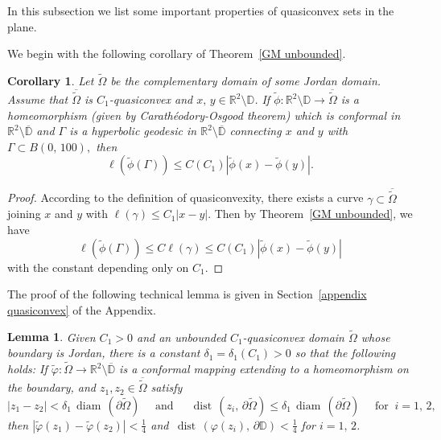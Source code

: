 \documentclass[reqno,11pt]{amsart}
\makeatletter
\def\dist{{\mathop\mathrm{\,dist\,}}}
\def\ez{\epsilon}
\def\wz{\widetilde}
\def\diam{{\mathop\mathrm{\,diam\,}}}
\newtheorem{lem}[thm]{Lemma}%
\newtheorem{cor}[thm]{Corollary}%
\numberwithin{equation}{section}
\theoremstyle{remark}
\makeatother
\begin{document}
In this subsection we list some important properties of quasiconvex sets in the plane.
 

We begin with the following corollary of Theorem~\ref{GM unbounded}. 
 
\begin{cor}\label{GH thm}
Let $\wz \Omega$ be the complementary domain of some Jordan domain.  Assume that $\overline{\wz \Omega}$ is $C_1$-quasiconvex and $x,\,y\in \mathbb R^2\setminus  {\mathbb  D}$. 
If $\wz \phi\colon \mathbb R^2\setminus  \mathbb D   \to\overline{\wz \Omega}$ is a homeomorphism (given by Carath\'eodory-Osgood  theorem) which is conformal in $\mathbb R^2\setminus \overline{\mathbb D}$ and 
$\Gamma$ is a hyperbolic
geodesic in $\mathbb R^2\setminus \overline{\mathbb  D}$ connecting $x$ and $y$ with
$ \Gamma \subset B(0,\,100),$ then
$$\ell(\wz \phi (\Gamma))\le C(C_1) |\wz \phi (x)- \wz \phi (y)|.$$
\end{cor} 
\begin{proof}
According to the definition of quasiconvexity, there exists a curve $\gamma\subset \overline{\wz \Omega}$ joining $x$ and $y$ with $\ell(\gamma)\le C_1 |x-y|$. Then by Theorem~\ref{GM unbounded}, we have 
$$\ell(\wz \phi (\Gamma) )\le C \ell(\gamma)\le C(C_1) |\wz \phi (x)- \wz \phi (y)|$$
with the constant depending only on $C_1$.
\end{proof}

The proof of  the following technical lemma is given in Section~\ref{appendix quasiconvex} of the Appendix.

\begin{lem} \label{ulkodist}
Given $C_1>0$  and an unbounded $C_1$-quasiconvex domain $\wz \Omega$ whose boundary is Jordan, there is a constant
$\delta_1=\delta_1(C_1)>0$ so that the following holds: If
$\wz \varphi\colon \wz \Omega \to \mathbb R^2\setminus \overline{\mathbb  D}$ is  a conformal mapping extending to a homeomorphism on the boundary, and
$z_1,z_2\in \overline{\wz \Omega}$ satisfy 
$$|z_1-z_2|<\delta_1 \diam(\partial \wz  \Omega)\quad  \text{ and }\quad \dist(z_i,\,\partial \wz  \Omega)\le \delta_1 \diam(\partial \wz  \Omega) \quad \text{ for }\ i=1,\,2,$$ then 
$|\wz \varphi (z_1)-\wz \varphi (z_2)| <\frac 1 4$ and $\dist(\varphi(z_i),\,\partial \mathbb D)<\frac 1 4$ for $i=1,\,2$. 
\end{lem}



 
\end{document}
